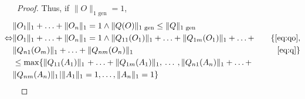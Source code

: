 \begin{proof}
Thus, if  $\lVert O \rVert_{1 \text{ gen}} = 1$,
\begin{align*}
  \hspace{-30pt}&  \lVert O_1  \rVert_1  + \ldots + \lVert O_n  \rVert_1 = 1  \wedge \lVert Q(O) \rVert_{1 \text{ gen}} \leq  \lVert Q \rVert_{1 \text{ gen}} \\
  \hspace{-30pt} \Leftrightarrow  & \lVert O_1  \rVert_1  + \ldots + \lVert O_n  \rVert_1 = 1  \wedge  \lVert Q_{11} (O_{1}) \rVert_{1} + \ldots +  \lVert Q_{1m} (O_{1}) \rVert_{1} + \ldots +  \hspace{10pt}&   \{\text{\autoref{eq:qo}}, \\
  \hspace{-30pt} & \lVert Q_{n1} (O_{m}) \rVert_{1} +  \ldots  + \lVert Q_{nm} (O_{n}) \rVert_{1}   & \text{\autoref{eq:q}} \} \\
  \hspace{-30pt}& \leq \max \{ \lVert Q_{11} (A_{1}) \rVert_{1} \hspace{1pt} + \ldots +  \lVert Q_{1m} (A_{1}) \rVert_{1}, \hspace{2pt} \ldots \hspace{2pt},  \lVert Q_{n1} (A_{n}) \rVert_{1} + \ldots +   \\
  \hspace{-30pt}&\lVert Q_{nm} (A_{n}) \rVert_{1} \hspace{1pt}  \vert  \lVert A_{1} \rVert_{1} = 1, \ldots, \lVert A_{n} \rVert_{1} = 1 \} \\

\end{align*}
\end{proof}
